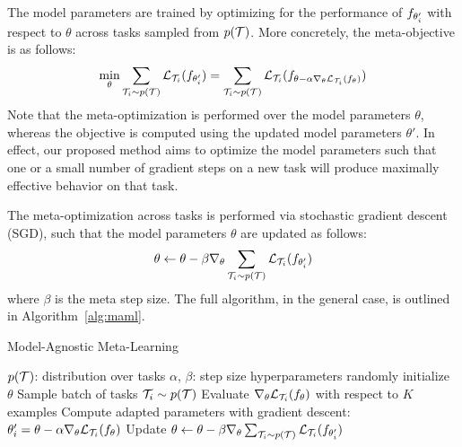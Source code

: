 \documentclass{article}
\begin{document}
The model parameters are trained by optimizing for the performance of $f_{\theta_i'}$ with respect to $\theta$ across tasks sampled from $p(\mathcal{T})$.
More concretely, the meta-objective is as follows:
\vspace{-0.15cm}
\begin{align*}
\vspace{-0.2cm}
\min_\theta \sum_{\task_i \sim p(\task)}  \lossi ( \learner_{\theta_i'}) 
= \sum_{\task_i \sim p(\task)}  \lossi ( \learner_{\theta - \alpha \nabla_\theta \lossi(f_\theta)})
\end{align*}
Note that the meta-optimization is performed over the model parameters $\theta$, whereas the objective is computed using the updated model parameters $\theta'$.
In effect, our proposed method aims to optimize the model parameters such that one or a small number of gradient steps on a new task will produce maximally effective behavior on that task.

The meta-optimization across tasks is performed via stochastic gradient descent (SGD), such that the model parameters $\theta$ are updated as follows:
\vspace{-0.15cm}
\begin{equation}
\label{eq:metaupdate}
\vspace{-0.2cm}
\theta \leftarrow \theta - \beta \nabla_\theta \sum_{\task_i \sim p(\task)}  \lossi ( \learner_{\theta_i'})
\end{equation}
where $\beta$ is the meta step size. The full algorithm, in the general case, is outlined in Algorithm~\ref{alg:maml}.

\begin{algorithm}[t]
\caption{Model-Agnostic Meta-Learning}
\label{alg:maml}
\begin{algorithmic}[1]
\REQUIRE $p(\mathcal{T})$: distribution over tasks
\REQUIRE $\alpha$, $\beta$: step size hyperparameters
\STATE randomly initialize $\theta$
\STATE Sample batch of tasks $\mathcal{T}_i \sim p(\mathcal{T})$
 \STATE Evaluate $\nabla_\theta \mathcal{L}_{\mathcal{T}_i}(f_\theta)$ with respect to $K$ examples
 \STATE Compute adapted parameters with gradient descent: $\theta_i'=\theta-\alpha \nabla_\theta  \mathcal{L}_{\mathcal{T}_i}(  f_\theta )$
 \ENDFOR
 \STATE Update $\theta \leftarrow \theta - \beta \nabla_\theta \sum_{\mathcal{T}_i \sim p(\mathcal{T})}  \mathcal{L}_{\mathcal{T}_i} ( f_{\theta_i'})$
\ENDWHILE
\end{algorithmic}
\end{algorithm}
\end{document}
